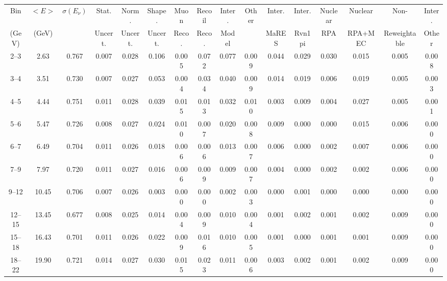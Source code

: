 \begin{turnpage}
\begin{table}[hpt]
   \setlength{\tabcolsep}{3pt}
    \begin{tabular}{cccccc|cccc|cccccc}
    \hline
 Bin & $<E>$  & $\sigma(E_\nu)$ & 	 Stat.  & 	 Norm. & 	 Shape. & 	 Muon  & 	 Recoil  & 	 Inter.  & 	 Other & Inter. &  	 Inter. &  	 Nuclear &  	 Nuclear &  	 Non- &  	 Inter. \\
 (GeV) 	    &  (GeV) &                & 	Uncert.  & 	 Uncert. & 	 Uncert. 	& 	  Reco. & 	 Reco.  & 	  Model & 	 & MaRES &  Rvn1pi &  	 RPA &  	 RPA+MEC &  	 Reweightable & Other \\
 \hline
 2--3 & 	 2.63 & 	 0.767 &  	 0.007 &  	 0.028 &  	 0.106 &  	 0.005 &  	 0.072 &  	 0.077 &  	 0.009 &  	 0.044 &  	 0.029 &  	 0.030 &  	 0.015 &  	 0.005 &  	 0.008 \\ 
 3--4 & 	 3.51 & 	 0.730 &  	 0.007 &  	 0.027 &  	 0.053 &  	 0.004 &  	 0.034 &  	 0.040 &  	 0.009 &  	 0.014 &  	 0.019 &  	 0.006 &  	 0.019 &  	 0.005 &  	 0.003 \\ 
 4--5 & 	 4.44 & 	 0.751 &  	 0.011 &  	 0.028 &  	 0.039 &  	 0.015 &  	 0.013 &  	 0.032 &  	 0.010 &  	 0.003 &  	 0.009 &  	 0.004 &  	 0.027 &  	 0.005 &  	 0.001 \\ 
 5--6 & 	 5.47 & 	 0.726 &  	 0.008 &  	 0.027 &  	 0.024 &  	 0.010 &  	 0.007 &  	 0.020 &  	 0.008 &  	 0.009 &  	 0.000 &  	 0.000 &  	 0.015 &  	 0.006 &  	 0.000 \\ 
 6--7 & 	 6.49 & 	 0.704 &  	 0.011 &  	 0.026 &  	 0.018 &  	 0.006 &  	 0.006 &  	 0.013 &  	 0.007 &  	 0.006 &  	 0.000 &  	 0.002 &  	 0.007 &  	 0.006 &  	 0.000 \\ 
 7--9 & 	 7.97 & 	 0.720 &  	 0.011 &  	 0.027 &  	 0.016 &  	 0.006 &  	 0.009 &  	 0.009 &  	 0.007 &  	 0.004 &  	 0.000 &  	 0.002 &  	 0.002 &  	 0.006 &  	 0.000 \\ 
 9--12 & 	 10.45 & 	 0.706 &  	 0.007 &  	 0.026 &  	 0.003 &  	 0.000 &  	 0.000 &  	 0.002 &  	 0.003 &  	 0.000 &  	 0.001 &  	 0.000 &  	 0.000 &  	 0.000 &  	 0.000 \\ 
 12--15 & 	 13.45 & 	 0.677 &  	 0.008 &  	 0.025 &  	 0.014 &  	 0.004 &  	 0.009 &  	 0.010 &  	 0.004 &  	 0.001 &  	 0.002 &  	 0.001 &  	 0.002 &  	 0.009 &  	 0.000 \\ 
 15--18 & 	 16.43 & 	 0.701 &  	 0.011 &  	 0.026 &  	 0.022 &  	 0.009 &  	 0.016 &  	 0.010 &  	 0.005 &  	 0.001 &  	 0.000 &  	 0.001 &  	 0.001 &  	 0.009 &  	 0.000 \\ 
 18--22 & 	 19.90 & 	 0.721 &  	 0.014 &  	 0.027 &  	 0.030 &  	 0.015 &  	 0.023 &  	 0.011 &  	 0.006 &  	 0.003 &  	 0.002 &  	 0.001 &  	 0.002 &  	 0.009 &  	 0.000 \\ 

\end{tabular}
\end{table}
\end{turnpage}
